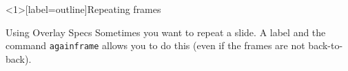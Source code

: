 \documentclass[aspectratio=169]{beamer}
\begin{document}
\begin{frame}<1>[label=outline]{Repeating frames}

  \begin{block}{Using Overlay Specs}
  Sometimes you want to repeat a slide.
  A label and the command \texttt{againframe} allows you to do this (even if the frames are not back-to-back).
  \end{block}




\end{frame}

\end{document}
